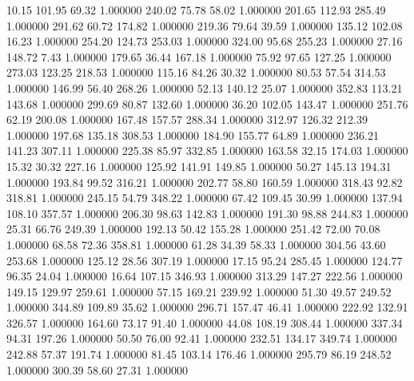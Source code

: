      10.15    101.95     69.32  1.000000
    240.02     75.78     58.02  1.000000
    201.65    112.93    285.49  1.000000
    291.62     60.72    174.82  1.000000
    219.36     79.64     39.59  1.000000
    135.12    102.08     16.23  1.000000
    254.20    124.73    253.03  1.000000
    324.00     95.68    255.23  1.000000
     27.16    148.72      7.43  1.000000
    179.65     36.44    167.18  1.000000
     75.92     97.65    127.25  1.000000
    273.03    123.25    218.53  1.000000
    115.16     84.26     30.32  1.000000
     80.53     57.54    314.53  1.000000
    146.99     56.40    268.26  1.000000
     52.13    140.12     25.07  1.000000
    352.83    113.21    143.68  1.000000
    299.69     80.87    132.60  1.000000
     36.20    102.05    143.47  1.000000
    251.76     62.19    200.08  1.000000
    167.48    157.57    288.34  1.000000
    312.97    126.32    212.39  1.000000
    197.68    135.18    308.53  1.000000
    184.90    155.77     64.89  1.000000
    236.21    141.23    307.11  1.000000
    225.38     85.97    332.85  1.000000
    163.58     32.15    174.03  1.000000
     15.32     30.32    227.16  1.000000
    125.92    141.91    149.85  1.000000
     50.27    145.13    194.31  1.000000
    193.84     99.52    316.21  1.000000
    202.77     58.80    160.59  1.000000
    318.43     92.82    318.81  1.000000
    245.15     54.79    348.22  1.000000
     67.42    109.45     30.99  1.000000
    137.94    108.10    357.57  1.000000
    206.30     98.63    142.83  1.000000
    191.30     98.88    244.83  1.000000
     25.31     66.76    249.39  1.000000
    192.13     50.42    155.28  1.000000
    251.42     72.00     70.08  1.000000
     68.58     72.36    358.81  1.000000
     61.28     34.39     58.33  1.000000
    304.56     43.60    253.68  1.000000
    125.12     28.56    307.19  1.000000
     17.15     95.24    285.45  1.000000
    124.77     96.35     24.04  1.000000
     16.64    107.15    346.93  1.000000
    313.29    147.27    222.56  1.000000
    149.15    129.97    259.61  1.000000
     57.15    169.21    239.92  1.000000
     51.30     49.57    249.52  1.000000
    344.89    109.89     35.62  1.000000
    296.71    157.47     46.41  1.000000
    222.92    132.91    326.57  1.000000
    164.60     73.17     91.40  1.000000
     44.08    108.19    308.44  1.000000
    337.34     94.31    197.26  1.000000
     50.50     76.00     92.41  1.000000
    232.51    134.17    349.74  1.000000
    242.88     57.37    191.74  1.000000
     81.45    103.14    176.46  1.000000
    295.79     86.19    248.52  1.000000
    300.39     58.60     27.31  1.000000
